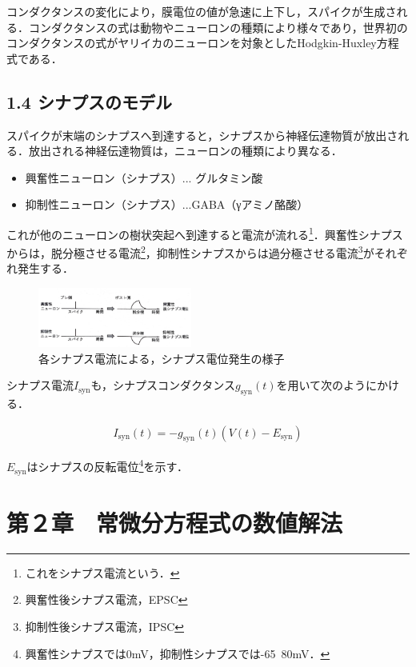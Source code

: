 \documentclass[dvipdfmx, A4j, twocolumn, 10.5pt]{jsarticle}
\begin{document}
コンダクタンスの変化により，膜電位の値が急速に上下し，スパイクが生成される．コンダクタンスの式は動物やニューロンの種類により様々であり，世界初のコンダクタンスの式がヤリイカのニューロンを対象としたHodgkin-Huxley方程式である．

\subsection*{1.4 シナプスのモデル}
スパイクが末端のシナプスへ到達すると，シナプスから神経伝達物質が放出される．放出される神経伝達物質は，ニューロンの種類により異なる．
\begin{itemize}
 \item 興奮性ニューロン（シナプス）... グルタミン酸
 \item 抑制性ニューロン（シナプス）...GABA（γアミノ酪酸）
\end{itemize}


これが他のニューロンの樹状突起へ到達すると電流が流れる\footnote{これをシナプス電流という．}．興奮性シナプスからは，脱分極させる電流\footnote{興奮性後シナプス電流，EPSC}，抑制性シナプスからは過分極させる電流\footnote{抑制性後シナプス電流，IPSC}がそれぞれ発生する．

\begin{figure}[h]
 \centering
 \includegraphics[width=0.45\textwidth]{isyn.pdf}
 \caption{各シナプス電流による，シナプス電位発生の様子}
\end{figure}

シナプス電流$I_{\text{syn}}$も，シナプスコンダクタンス$g_{\text{syn}}(t)$を用いて次のようにかける．

\begin{align*}
 I_{\text{syn}}(t) = -g_{\text{syn}}(t) \left( V(t) - E_{\text{syn}} \right)
\end{align*}


$E_{\text{syn}}$はシナプスの反転電位\footnote{興奮性シナプスでは0mV，抑制性シナプスでは-65~80mV．}を示す．


\section*{第２章　常微分方程式の数値解法}
\end{document}
